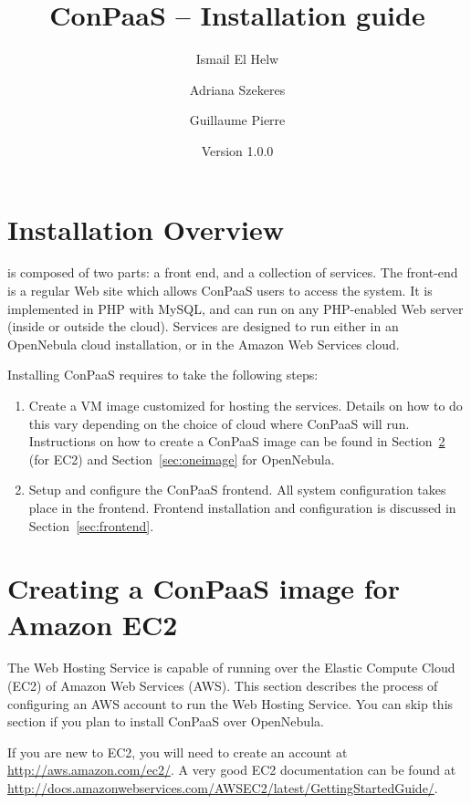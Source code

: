 \documentclass[10pt]{article}
\title{ConPaaS -- Installation guide}
\author{Ismail El Helw \and Adriana Szekeres \and Guillaume Pierre}
\date{Version 1.0.0}
\begin{document}
\maketitle

\T\vfil
\T\tableofcontents
\T\vfil
\T\newpage

\section{Installation Overview}
\label{sec:overview}

 is composed of two parts: a
front end, and a collection of services. The front-end is a regular
Web site which allows ConPaaS users to access the system. It is
implemented in PHP with MySQL, and can run on any PHP-enabled Web
server (inside or outside the cloud).  Services are designed to run
either in an OpenNebula cloud installation, or in the Amazon Web
Services cloud.

Installing ConPaaS requires to take the following steps:

\begin{enumerate}
\item Create a VM image customized for hosting the services. Details
  on how to do this vary depending on the choice of cloud where
  ConPaaS will run. Instructions on how to create a ConPaaS image can
  be found in Section~\ref{sec:ec2image} (for EC2) and
  Section~\ref{sec:oneimage} for OpenNebula.
\item Setup and configure the ConPaaS frontend. All system
  configuration takes place in the frontend. Frontend installation and
  configuration is discussed in Section~\ref{sec:frontend}.
\end{enumerate}

\section{Creating a ConPaaS image for Amazon EC2}
\label{sec:ec2image}

The Web Hosting Service is capable of running over the Elastic Compute
Cloud (EC2) of Amazon Web Services (AWS). This section describes the
process of configuring an AWS account to run the Web Hosting Service.
You can skip this section if you plan to install ConPaaS over
OpenNebula.

If you are new to EC2, you will need to create an account at
\url{http://aws.amazon.com/ec2/}. A very good EC2 documentation can be
found at
\url{http://docs.amazonwebservices.com/AWSEC2/latest/GettingStartedGuide/}.
\end{document}
